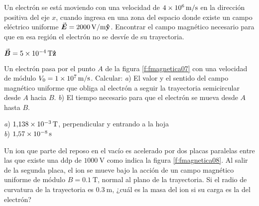 %
\begin{Exercise}
  Un electrón se está moviendo con una velocidad de $\SI{4E6}{\metre/\second}$ en la dirección positiva del eje $x$, cuando ingresa en una zona del espacio donde existe un campo eléctrico uniforme $\va*{E} = \SI{2000}{\volt/\metre}\vu{y}$. Encontrar el campo magnético necesario para que en esa región el electrón no se desvíe de su trayectoria.
\end{Exercise}
\begin{Answer}
  $\va*{B} = \SI{5E-4}{\tesla}\vu{z}$
\end{Answer}
%
\begin{Exercise}\label{p:fmagnetica07}
  Un electrón pasa por el punto $A$ de la figura \ref{f:fmagnetica07} con una velocidad de módulo $V_0 = \SI{1E7}{\metre/\second}$. Calcular: \textit{a}) El valor y el sentido del campo magnético uniforme que obliga al electrón a seguir la trayectoria semicircular desde $A$ hacia $B$. \textit{b}) El tiempo necesario para que el electrón se mueva desde $A$ hasta $B$.
\end{Exercise}
\begin{Answer}
  \begin{minipage}[t]{.4\textwidth}
    \textit{a}) $\SI{1.138E-3}{\tesla}$, perpendicular y entrando a la hoja\\ \textit{b}) $\SI{1.57E-8}{\second}$
  \end{minipage}
\end{Answer}
%
\begin{center}
\end{center}
%
\begin{Exercise}\label{p:fmagnetica08}
  Un ion que parte del reposo en el vacío es acelerado por dos placas paralelas entre las que existe una ddp de $\SI{1000}{\volt}$ como indica la figura \ref{f:fmagnetica08}. Al salir de la segunda placa, el ion se mueve bajo la acción de un campo magnético uniforme de módulo $B = \SI{0.1}{\tesla}$, normal al plano de la trayectoria. Si el radio de curvatura de la trayectoria es $\SI{0.3}{\metre}$, ¿cuál es la masa del ion si su carga es la del electrón?
\end{Exercise}
